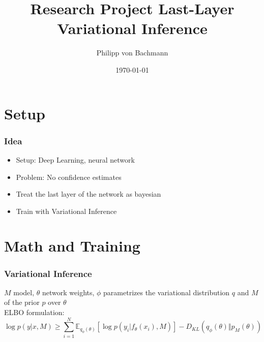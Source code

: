 \documentclass{beamer}
\title{Research Project Last-Layer Variational Inference}
\author{Philipp von Bachmann}
\institute{University of Tübingen}
\date{\today}
\begin{document}
        \begin{frame}
            \titlepage
        \end{frame}
        
        \section{Setup}
        \begin{frame}
            \frametitle{Idea}
            \begin{itemize}
                \item Setup: Deep Learning, neural network
                \item Problem: No confidence estimates
                \item Treat the last layer of the network as bayesian
                \item Train with Variational Inference
            \end{itemize}
        \end{frame}
        
        \section{Math and Training}
        \begin{frame}
            \frametitle{Variational Inference}
            $M$ model, $\theta$ network weights, $\phi$ parametrizes the variational distribution $q$ and $M$ of the prior $p$ over $\theta$\\
            ELBO formulation:
            \begin{equation*}
                \log{p(y \vert x, M)} \geq \sum_{i=1}^N \mathbb{E}_{q_{\phi}(\theta)}[\log{p(y_i \vert f_{\theta}(x_i), M)}] - D_{KL}(q_{\phi}(\theta) \Vert p_{M}(\theta))
            \end{equation*}
        \end{frame}
\end{document}

